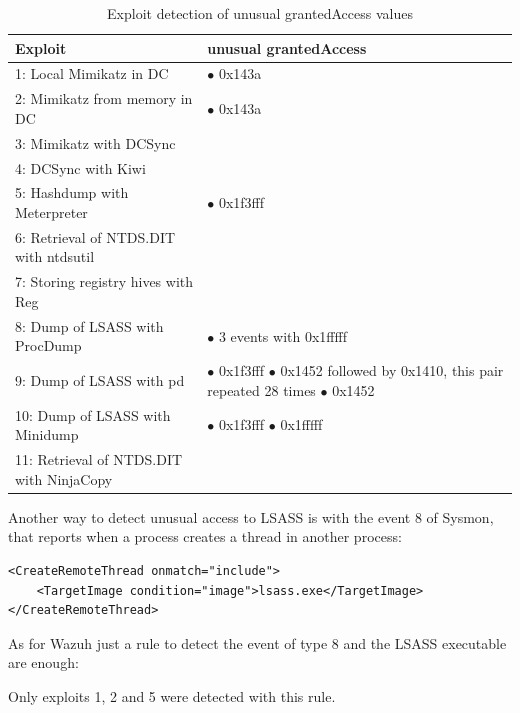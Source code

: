\begin{table}[H]
	\begin{tabularx}{\textwidth}{|l|X|}
		\hline
		\rowcolor{gray!30}
		Exploit & unusual grantedAccess\\ \hline
		1: Local Mimikatz in DC& \cellcolor{green!60}$\bullet$ 0x143a\\ \hline
		2: Mimikatz from memory in DC& \cellcolor{green!60} $\bullet$ 0x143a\\ \hline
		3: Mimikatz with DCSync& \cellcolor{red!60}\\ \hline
		4: DCSync with Kiwi& \cellcolor{red!60}\\ \hline
		5: Hashdump with Meterpreter& \cellcolor{green!60}$\bullet$ 0x1f3fff\\ \hline
		6: Retrieval of NTDS.DIT with ntdsutil& \cellcolor{red!60}\\ \hline
		7: Storing registry hives with Reg& \cellcolor{red!60}\\ \hline
		8: Dump of LSASS with ProcDump& \cellcolor{green!60}$\bullet$ 3 events with 0x1fffff\\ \hline
		9: Dump of LSASS with pd& \cellcolor{green!60}
			$\bullet$ 0x1f3fff \linej
			$\bullet$ 0x1452 followed by 0x1410, this pair repeated 28 times \linej
			$\bullet$ 0x1452 \\ \hline
		10: Dump of LSASS with Minidump& \cellcolor{green!60}
			$\bullet$ 0x1f3fff \linej
			$\bullet$ 0x1fffff \\ \hline
		11: Retrieval of NTDS.DIT with NinjaCopy& \cellcolor{red!60}\\ \hline
	\end{tabularx}
	\caption{Exploit detection of unusual grantedAccess values}
\end{table}
\linej
Another way to detect unusual access to LSASS is with the event 8 of Sysmon\cite{detection_events}, that reports when a process creates a thread in another process:
\begin{lstlisting}[style=xml]
<CreateRemoteThread onmatch="include">
	<TargetImage condition="image">lsass.exe</TargetImage>
</CreateRemoteThread>
\end{lstlisting}
\linej
As for Wazuh just a rule to detect the event of type 8 and the LSASS executable are enough:

\linej
Only exploits 1, 2 and 5 were detected with this rule.

